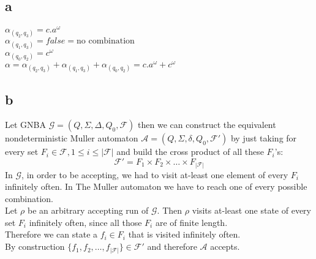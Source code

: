 \documentclass[11pt]{article}
\begin{document}
\subsection{a}
$\alpha_{(q_2,q_3)} = c.a^\omega$\\
$\alpha_{(q_1,q_3)} = false = \text{no combination}$\\
$\alpha_{(q_0,q_2)} = c^\omega$\\
$\alpha = \alpha_{(q_2,q_3)} +\alpha_{(q_1,q_3)} +\alpha_{(q_0,q_2)} = c.a^\omega+c^\omega$

\subsection{b}
Let GNBA $\mathcal{G}=(Q,\Sigma,\Delta, Q_0, \mathcal{F})$ then we can construct the equivalent nondeterministic Muller automaton $\mathcal{A} = (Q, \Sigma, \delta, Q_0, \mathcal{F}')$ by just taking for every set $F_i\in\mathcal{F}, 1\le i\le |\mathcal{F}|$ and build the cross product of all these $F_i$'s:
	$$\mathcal{F}' =  F_1 \times F_2 \times \dots \times F_{|\mathcal{F}|}$$
In $\mathcal{G}$, in order to be accepting, we had to visit at-least one element of every $F_i$ infinitely often. In The Muller automaton we have to reach one of every possible combination.\\

Let $\rho$ be an arbitrary accepting run of $\mathcal{G}$. Then $\rho$ visits at-least one state of every set $F_i$ infinitely often, since all those $F_i$ are of finite length.\\
Therefore we can state a $f_i \in F_i$ that is visited infinitely often.\\
By construction $\{f_1,f_2,\dots, f_{|\mathcal{F}|}\} \in \mathcal{F}'$ and therefore $\mathcal{A}$ accepts.

\end{document}
